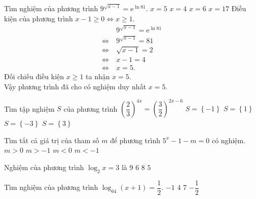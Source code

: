 \begin{ex}%
	Tìm nghiệm của phương trình $9^{\sqrt{x - 1}} = \mathrm{e}^{\ln 81}$.
	\choice
	{\True $x = 5$}
	{$x = 4$}
	{$x = 6$}
	{$x = 17$}
	\loigiai
	{
		Điều kiện của phương trình $x - 1 \geq 0 \Leftrightarrow x \geq 1$.
		\begin{align*}
			& 9^{\sqrt{x - 1}} = \mathrm{e}^{\ln 81} \\
			\Leftrightarrow \ & 9^{\sqrt{x - 1}} = 81 \\
			\Leftrightarrow \ & \sqrt{x - 1} = 2 \\
			\Leftrightarrow \ & x - 1 = 4 \\
			\Leftrightarrow \ & x = 5.
		\end{align*}
		Đối chiếu điều kiện $x \geq 1$ ta nhận $x = 5$.\\
		Vậy phương trình đã cho có nghiệm duy nhất $x = 5$.
	}
\end{ex}

\begin{ex}%
	Tìm tập nghiệm $S$ của phương trình $\left(\dfrac{2}{3}\right)^{4x}=\left(\dfrac{3}{2}\right)^{2x-6}$
	\choice
	{$ S=\left\{{-1}\right\}$}
	{\True $ S=\left\{ 1\right\}$}
	{$ S=\left\{{-3}\right\}$}
	{$ S=\left\{ 3\right\}$}
\end{ex}

\begin{ex} Tìm tất cả giá trị của tham số $m$ để phương trình $5^x-1-m=0$ có nghiệm.
	\choice
	{ $m>0$}
	{\True $m>-1$}
	{$m<0$}
	{$m<-1$}
\end{ex} 

\begin{ex}%
	Nghiệm của phương trình $\log_2x=3$ là
	\choice
	{$9$}
	{$6$}
	{\True $8$}
	{$5$}
\end{ex}

\begin{ex}%
	Tìm nghiệm của phương trình $\log_{64}(x+1)=\dfrac{1}{2}$.
	\choice
	{$-1$}
	{$4$}
	{\True $7$}
	{$-\dfrac{1}{2}$}
\end{ex}

